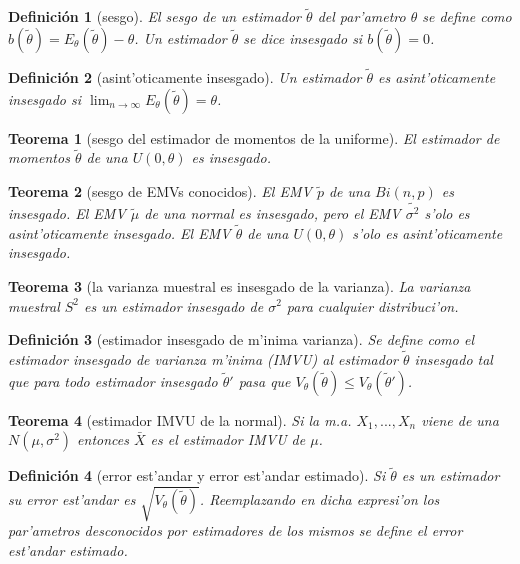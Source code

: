 \documentclass[a4paper,spanish]{article}
\newcommand{\limite}[2]{\lim_{ #1 \rightarrow #2}}
\newtheorem{teo}{Teorema}
\newtheorem{defi}{Definici\'on}
\begin{document}
\begin{defi}[sesgo]
El \emph{sesgo} de un estimador $\tilde{\theta}$ del par'ametro $\theta$ se
define como $b(\tilde{\theta}) = E_\theta(\tilde{\theta}) - \theta$. Un
estimador $\tilde{\theta}$ se dice \emph{insesgado} si $b(\tilde{\theta})=0$.
\end{defi}

\begin{defi}[asint'oticamente insesgado]
Un estimador $\tilde{\theta}$ es \emph{asint'oticamente insesgado} si
$\limite{n}{\infty} E_\theta(\tilde{\theta}) = \theta$.
\end{defi}

\begin{teo}[sesgo del estimador de momentos de la uniforme]
El estimador de momentos $\tilde{\theta}$ de una $U(0,\theta)$ es insesgado.
\end{teo}

\begin{teo}[sesgo de EMVs conocidos]
El EMV $\tilde{p}$ de una $Bi(n,p)$ es insesgado. El EMV $\tilde{\mu}$ de una
normal es insesgado, pero el EMV $\tilde{\sigma^2}$ s'olo es asint'oticamente
insesgado. El EMV $\tilde{\theta}$ de una $U(0,\theta)$ s'olo es 
asint'oticamente insesgado.
\end{teo}

\begin{teo}[la varianza muestral es insesgado de la varianza]
La varianza muestral $S^2$ es un estimador insesgado de $\sigma^2$ para
cualquier distribuci'on.
\end{teo}

\begin{defi}[estimador insesgado de m'inima varianza]
Se define como el \emph{estimador insesgado de varianza m'inima} (IMVU) al
estimador $\tilde{\theta}$ insesgado tal que para todo estimador insesgado
$\tilde{\theta}'$ pasa que 
$V_\theta(\tilde{\theta}) \leq V_\theta(\tilde{\theta}')$.
\end{defi}

\begin{teo}[estimador IMVU de la normal]
Si la m.a. $X_1,...,X_n$ viene de una $N(\mu,\sigma^2)$ entonces $\bar{X}$ es
el estimador IMVU de $\mu$.
\end{teo}

\begin{defi}[error est'andar y error est'andar estimado]
Si $\tilde{\theta}$ es un estimador su \emph{error est'andar} es 
$\sqrt{V_\theta(\tilde{\theta})}$. Reemplazando en dicha expresi'on los
par'ametros desconocidos por estimadores de los mismos se define el
\emph{error est'andar estimado}.
\end{defi}
\end{document}
